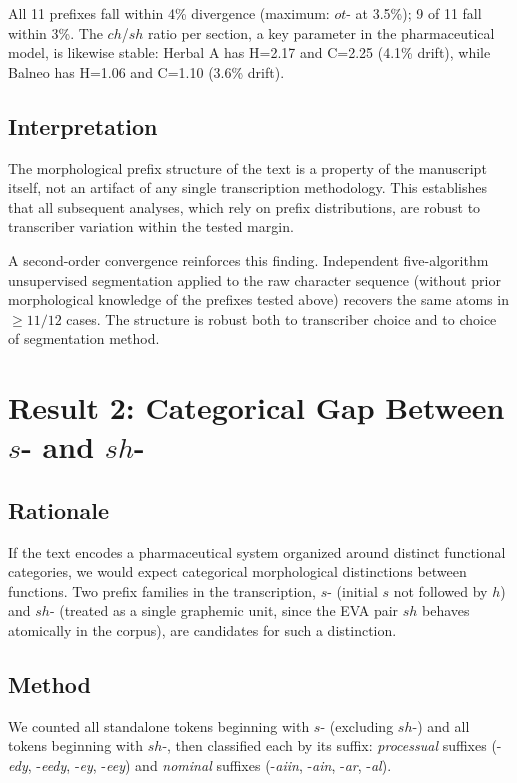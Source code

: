 \documentclass[11pt,a4paper]{article}
\begin{document}
All 11 prefixes fall within 4\% divergence (maximum: $ot$- at 3.5\%); 9 of 11 fall within 3\%. The $ch$/$sh$ ratio per section, a key parameter in the pharmaceutical model, is likewise stable: Herbal A has H=2.17 and C=2.25 (4.1\% drift), while Balneo has H=1.06 and C=1.10 (3.6\% drift).

\subsection{Interpretation}

The morphological prefix structure of the text is a property of the manuscript itself, not an artifact of any single transcription methodology. This establishes that all subsequent analyses, which rely on prefix distributions, are robust to transcriber variation within the tested margin.

A second-order convergence reinforces this finding. Independent five-algorithm unsupervised segmentation applied to the raw character sequence (without prior morphological knowledge of the prefixes tested above) recovers the same atoms in $\geq 11/12$ cases. The structure is robust both to transcriber choice and to choice of segmentation method.

\section{Result 2: Categorical Gap Between $s$- and $sh$-}

\subsection{Rationale}

If the text encodes a pharmaceutical system organized around distinct functional categories, we would expect categorical morphological distinctions between functions. Two prefix families in the transcription, $s$- (initial $s$ not followed by $h$) and $sh$- (treated as a single graphemic unit, since the EVA pair $sh$ behaves atomically in the corpus), are candidates for such a distinction.

\subsection{Method}

We counted all standalone tokens beginning with $s$- (excluding $sh$-) and all tokens beginning with $sh$-, then classified each by its suffix: \textit{processual} suffixes (-\textit{edy}, -\textit{eedy}, -\textit{ey}, -\textit{eey}) and \textit{nominal} suffixes (-\textit{aiin}, -\textit{ain}, -\textit{ar}, -\textit{al}).
\end{document}
